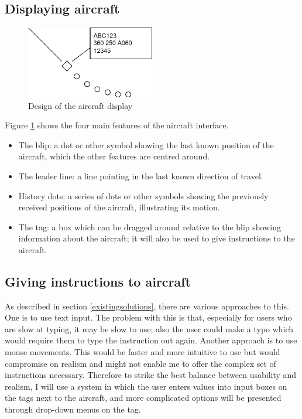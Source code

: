 \documentclass{article}
\begin{document}
\subsection{Displaying aircraft}
\begin{figure}[H]
\centering
\includegraphics[width=0.5\textwidth]{diagrams/aeroplane_design.png}
\caption{\label{fig:aeroplane_design}Design of the aircraft display}
\end{figure}
Figure \ref{fig:aeroplane_design} shows the four main features of the aircraft interface.
\begin{itemize}
    \item The blip: a dot or other symbol showing the last known position of the aircraft, which the other features are centred around.
    \item The leader line: a line pointing in the last known direction of travel.
    \item History dots: a series of dots or other symbols showing the previously received positions of the aircraft, illustrating its motion.
    \item The tag: a box which can be dragged around relative to the blip showing information about the aircraft; it will also be used to give instructions to the aircraft.
\end{itemize}


\subsection{Giving instructions to aircraft}
As described in section \ref{existingsolutions}, there are various approaches to this.
One is to use text input.
The problem with this is that, especially for users who are slow at typing, it may be slow to use; also the user could make a typo which would require them to type the instruction out again.
Another approach is to use mouse movements.
This would be faster and more intuitive to use but would compromise on realism and might not enable me to offer the complex set of instructions necessary.
Therefore to strike the best balance between usability and realism, I will use a system in which the user enters values into input boxes on the tags next to the aircraft, and more complicated options will be presented through drop-down menus on the tag.
\end{document}
